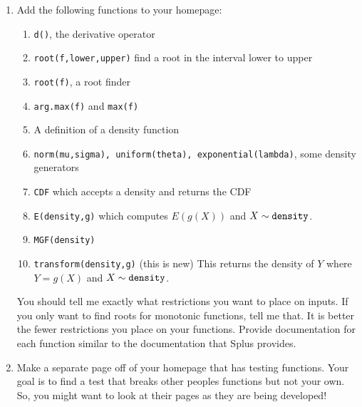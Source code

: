 \begin{enumerate}
\item Add the following functions to your homepage:
\begin{enumerate}
\item {\tt d()}, the derivative operator
\item {\tt root(f,lower,upper)} find a root in the interval lower to upper
\item {\tt root(f)}, a root finder 
\item {\tt arg.max(f)} and {\tt max(f)}
\item A definition of a density function
\item {\tt norm(mu,sigma), uniform(theta), exponential(lambda)}, some
density generators
\item {\tt CDF} which accepts a density and returns the CDF
\item {\tt E(density,g)} which computes $E(g(X))$ and $X \sim {\tt
density}$.
\item {\tt MGF(density)}
\item {\tt transform(density,g)} (this is new) This returns the
density of $Y$ where $Y = g(X)$ and $X \sim {\tt density}$.
\end{enumerate}
You should tell me exactly what restrictions you want to place on
inputs.  If you only want to find roots for monotonic functions, tell
me that.  It is better the fewer restrictions you place on your
functions.  Provide documentation for each function similar to the
documentation that Splus provides.  

\item Make a separate page off of your homepage that has testing
functions.  Your goal is to find a test that breaks other peoples
functions but not your own.  So, you might want to look at their pages
as they are being developed!

\end{enumerate}


